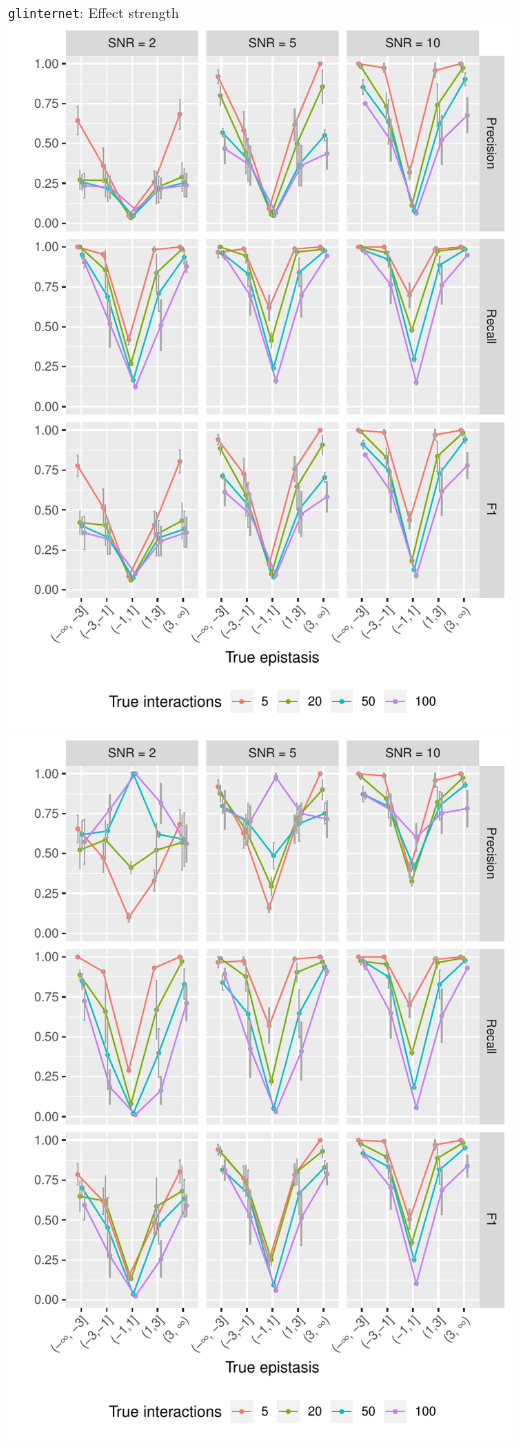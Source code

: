 \begin{frame}{\texttt{glinternet}: Effect strength}
\includegraphics[width=0.5\linewidth]{output/FXstrength_PRF_n1000_tno_mult1_xyzFALSE_}%
\includegraphics[width=0.5\linewidth]{output/FXstrength_PRF_n1000_tyes_mult1_xyzFALSE_}
\end{frame}

